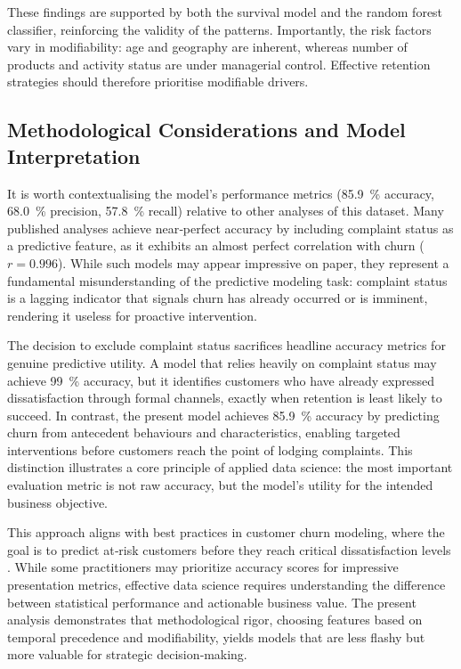 \documentclass[12pt]{article}
\begin{document}
These findings are supported by both the survival model and the random forest classifier, reinforcing the validity of the patterns.  Importantly, the risk factors vary in modifiability: age and geography are inherent, whereas number of products and activity status are under managerial control.  Effective retention strategies should therefore prioritise modifiable drivers.

\subsection{Methodological Considerations and Model Interpretation}
It is worth contextualising the model's performance metrics (85.9~\% accuracy, 68.0~\% precision, 57.8~\% recall) relative to other analyses of this dataset.  Many published analyses achieve near‑perfect accuracy by including complaint status as a predictive feature, as it exhibits an almost perfect correlation with churn (\(r=0.996\)).  While such models may appear impressive on paper, they represent a fundamental misunderstanding of the predictive modeling task: complaint status is a lagging indicator that signals churn has already occurred or is imminent, rendering it useless for proactive intervention.

The decision to exclude complaint status sacrifices headline accuracy metrics for genuine predictive utility.  A model that relies heavily on complaint status may achieve 99~\% accuracy, but it identifies customers who have already expressed dissatisfaction through formal channels, exactly when retention is least likely to succeed.  In contrast, the present model achieves 85.9~\% accuracy by predicting churn from antecedent behaviours and characteristics, enabling targeted interventions before customers reach the point of lodging complaints.  This distinction illustrates a core principle of applied data science: the most important evaluation metric is not raw accuracy, but the model's utility for the intended business objective.

This approach aligns with best practices in customer churn modeling, where the goal is to predict at‑risk customers before they reach critical dissatisfaction levels \citep{kumar2022customerretention}.  While some practitioners may prioritize accuracy scores for impressive presentation metrics, effective data science requires understanding the difference between statistical performance and actionable business value.  The present analysis demonstrates that methodological rigor, choosing features based on temporal precedence and modifiability, yields models that are less flashy but more valuable for strategic decision‑making.
\end{document}
